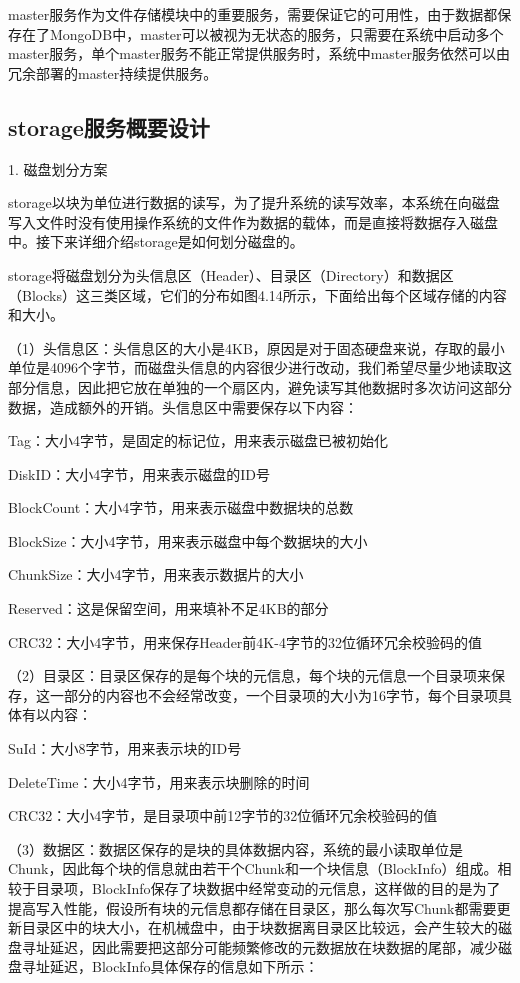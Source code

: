master服务作为文件存储模块中的重要服务，需要保证它的可用性，由于数据都保存在了MongoDB中，master可以被视为无状态的服务，只需要在系统中启动多个master服务，单个master服务不能正常提供服务时，系统中master服务依然可以由冗余部署的master持续提供服务。

\subsection{storage服务概要设计}

1. 磁盘划分方案

storage以块为单位进行数据的读写，为了提升系统的读写效率，本系统在向磁盘写入文件时没有使用操作系统的文件作为数据的载体，而是直接将数据存入磁盘中。接下来详细介绍storage是如何划分磁盘的。

storage将磁盘划分为头信息区（Header）、目录区（Directory）和数据区（Blocks）这三类区域，它们的分布如图4.14所示，下面给出每个区域存储的内容和大小。

（1）头信息区：头信息区的大小是4KB，原因是对于固态硬盘来说，存取的最小单位是4096个字节，而磁盘头信息的内容很少进行改动，我们希望尽量少地读取这部分信息，因此把它放在单独的一个扇区内，避免读写其他数据时多次访问这部分数据，造成额外的开销。头信息区中需要保存以下内容：

Tag：大小4字节，是固定的标记位，用来表示磁盘已被初始化

DiskID：大小4字节，用来表示磁盘的ID号

BlockCount：大小4字节，用来表示磁盘中数据块的总数

BlockSize：大小4字节，用来表示磁盘中每个数据块的大小

ChunkSize：大小4字节，用来表示数据片的大小

Reserved：这是保留空间，用来填补不足4KB的部分

CRC32：大小4字节，用来保存Header前4K-4字节的32位循环冗余校验码的值

（2）目录区：目录区保存的是每个块的元信息，每个块的元信息一个目录项来保存，这一部分的内容也不会经常改变，一个目录项的大小为16字节，每个目录项具体有以内容：

SuId：大小8字节，用来表示块的ID号

DeleteTime：大小4字节，用来表示块删除的时间

CRC32：大小4字节，是目录项中前12字节的32位循环冗余校验码的值

（3）数据区：数据区保存的是块的具体数据内容，系统的最小读取单位是Chunk，因此每个块的信息就由若干个Chunk和一个块信息（BlockInfo）组成。相较于目录项，BlockInfo保存了块数据中经常变动的元信息，这样做的目的是为了提高写入性能，假设所有块的元信息都存储在目录区，那么每次写Chunk都需要更新目录区中的块大小，在机械盘中，由于块数据离目录区比较远，会产生较大的磁盘寻址延迟，因此需要把这部分可能频繁修改的元数据放在块数据的尾部，减少磁盘寻址延迟，BlockInfo具体保存的信息如下所示：

